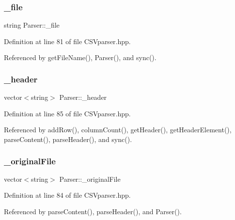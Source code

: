 \mbox{\label{class_parser_af173d4c3df007ee81d42887b4a15060a}} 
\subsubsection{\+\_\+file}
{\footnotesize\ttfamily string Parser\+::\+\_\+file\hspace{0.3cm}{\ttfamily [private]}}



Definition at line 81 of file C\+S\+Vparser.\+hpp.



Referenced by get\+File\+Name(), Parser(), and sync().

\mbox{\label{class_parser_aa4b3a567bac767923745b4bd2f176c6f}} 
\subsubsection{\+\_\+header}
{\footnotesize\ttfamily vector$<$string$>$ Parser\+::\+\_\+header\hspace{0.3cm}{\ttfamily [private]}}



Definition at line 85 of file C\+S\+Vparser.\+hpp.



Referenced by add\+Row(), column\+Count(), get\+Header(), get\+Header\+Element(), parse\+Content(), parse\+Header(), and sync().

\mbox{\label{class_parser_abecadd4e857d14479da2fa7ec344f21b}} 
\subsubsection{\+\_\+original\+File}
{\footnotesize\ttfamily vector$<$string$>$ Parser\+::\+\_\+original\+File\hspace{0.3cm}{\ttfamily [private]}}



Definition at line 84 of file C\+S\+Vparser.\+hpp.



Referenced by parse\+Content(), parse\+Header(), and Parser().

\mbox{\label{class_parser_ae09c229a5f86b536e11fe4f1a3274317}} 
